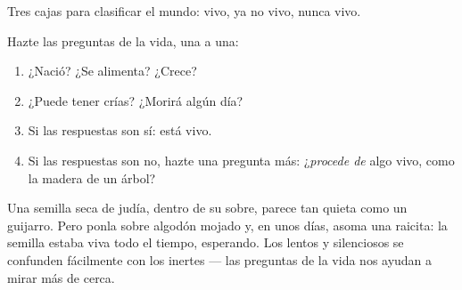 \begin{omfigure}

{\small Tres cajas para clasificar el mundo: vivo, ya no vivo,
nunca vivo.}
\end{omfigure}

\begin{method}\label{met:g1:living-or-not:decide}
Hazte las preguntas de la vida, una a una:
\begin{enumerate}
  \item ¿Nació? ¿Se alimenta? ¿Crece?
  \item ¿Puede tener crías? ¿Morirá algún día?
  \item Si las respuestas son sí: está vivo.
  \item Si las respuestas son no, hazte una pregunta más:
        ¿\emph{procede de} algo vivo, como la madera de un árbol?
\end{enumerate}
\end{method}

\begin{remark}\label{rem:g1:living-or-not:seed}
Una semilla seca de judía, dentro de su sobre, parece tan quieta como
un guijarro. Pero ponla sobre algodón mojado y, en unos días, asoma
una raicita: la semilla estaba viva todo el tiempo, esperando. Los
 lentos y silenciosos se confunden fácilmente con los
inertes --- las preguntas de la vida nos ayudan a mirar más de cerca.
\end{remark}


